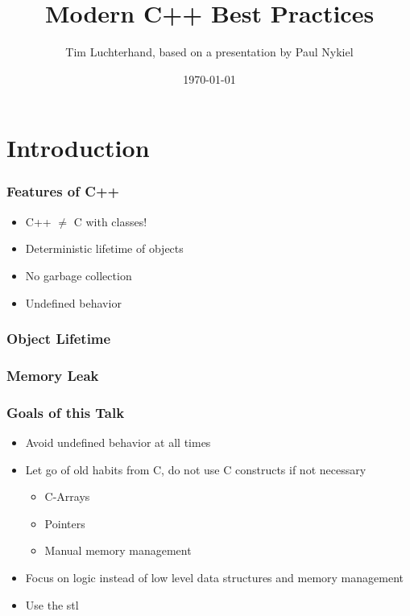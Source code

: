 \documentclass[usenames,dvipsnames,svgnames,table,aspectratio=169]{beamer}
\title{Modern C++ Best Practices}
\author{Tim Luchterhand, based on a presentation by Paul Nykiel \cite{Nykiel2020}}
\date{\today}
\begin{document}
\maketitle

\frame{
    \tableofcontents
}

\section{Introduction}
\begin{frame}
    \frametitle{Features of C++}
    \begin{itemize}
        \item<+-> C++ $\neq$ C with classes!
        \item<+-> Deterministic lifetime of objects
        \item<+-> No garbage collection
        \item<+-> Undefined behavior
    \end{itemize}
\end{frame}

\begin{frame}
    \frametitle{Object Lifetime}
    
\end{frame}

\begin{frame}
    \frametitle{Memory Leak}
    
\end{frame}

\begin{frame}
    \frametitle{Goals of this Talk}
    \begin{itemize}
        \item<+-> Avoid undefined behavior at all times
        \item<+-> Let go of old habits from C, do not use C constructs if not necessary
        \begin{itemize}
            \item<+-> C-Arrays
            \item<+-> Pointers
            \item<+-> Manual memory management
        \end{itemize}
        \item<+-> Focus on logic instead of low level data structures and memory management
        \item<+-> Use the stl
    \end{itemize}
\end{frame}
\end{document}
